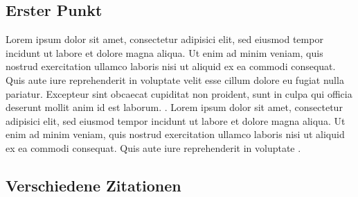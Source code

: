 \clearpage
\subsection{Erster Punkt}
Lorem ipsum dolor sit amet, consectetur adipisici elit, sed eiusmod tempor incidunt ut labore et dolore magna aliqua. Ut enim ad minim veniam, quis nostrud exercitation ullamco laboris nisi ut aliquid ex ea commodi consequat. Quis aute iure reprehenderit in voluptate velit esse cillum dolore eu fugiat nulla pariatur. Excepteur sint obcaecat cupiditat non proident, sunt in culpa qui officia deserunt mollit anim id est laborum. \cite{zeichner_teaching_2000}. Lorem ipsum dolor sit amet, consectetur adipisici elit, sed eiusmod tempor incidunt ut labore et dolore magna aliqua. Ut enim ad minim veniam, quis nostrud exercitation ullamco laboris nisi ut aliquid ex ea commodi consequat. Quis aute iure reprehenderit in voluptate \cite{kitsantas_college_2007}.

\subsection{Verschiedene Zitationen}
\cite{abrami_using_2013}

\cite[p. 2]{heinrich_preparation_2007}

\citeauthor{pintrich_motivational_1990}

\citeyear[p. 2]{alshammari_meta-analysis_2013}

\citeauthor{ziegler_hochbegabung_2008} \citeyear{ziegler_hochbegabung_2008}

